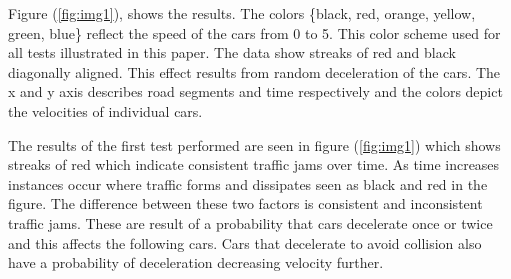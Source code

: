 \documentclass[12pt]{extarticle}
\begin{document}
Figure (\ref{fig:img1}), shows the results. The colors \{black, red, orange, yellow, green, blue\} reflect the speed of the cars from 0 to 5. This color scheme used for all tests illustrated in this paper. The data show streaks of red and black diagonally aligned. This effect results from random deceleration of the cars. The x and y axis describes road segments and time respectively and the colors depict the velocities of individual cars.

The results of the first test performed are seen in figure (\ref{fig:img1}) which shows streaks of red which indicate consistent traffic jams over time. As time increases instances occur where traffic forms and dissipates seen as black and red in the figure. The difference between these two factors is consistent and inconsistent traffic jams. These are result of a probability that cars decelerate once or twice and this affects the following cars. Cars that decelerate to avoid collision also have a probability of deceleration decreasing velocity further.
\end{document}
